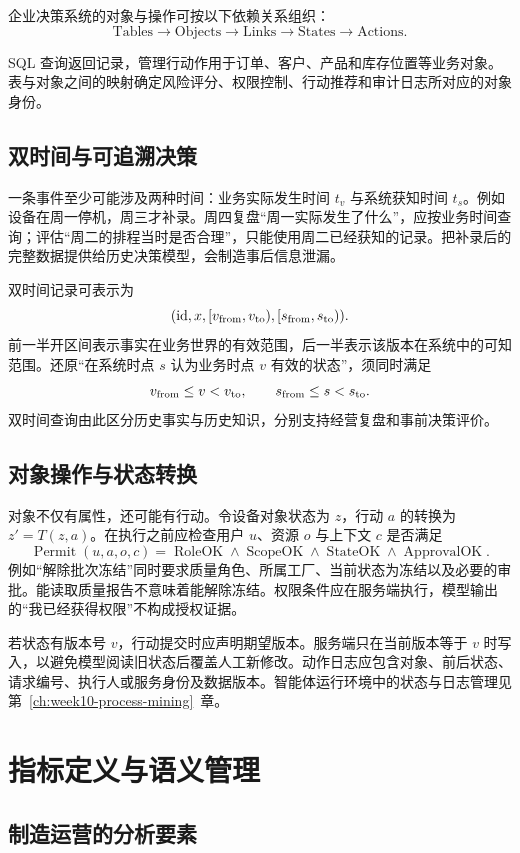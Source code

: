 企业决策系统的对象与操作可按以下依赖关系组织：
\[
\text{Tables}\rightarrow\text{Objects}\rightarrow\text{Links}\rightarrow\text{States}\rightarrow\text{Actions}.
\]

SQL 查询返回记录，管理行动作用于订单、客户、产品和库存位置等业务对象。表与对象之间的映射确定风险评分、权限控制、行动推荐和审计日志所对应的对象身份。

\subsection{双时间与可追溯决策}
一条事件至少可能涉及两种时间：业务实际发生时间 \(t_v\) 与系统获知时间 \(t_s\)。例如设备在周一停机，周三才补录。周四复盘“周一实际发生了什么”，应按业务时间查询；评估“周二的排程当时是否合理”，只能使用周二已经获知的记录。把补录后的完整数据提供给历史决策模型，会制造事后信息泄漏。

双时间记录可表示为
\[
(\text{id},x,[v_{\rm from},v_{\rm to}),[s_{\rm from},s_{\rm to})).
\]
前一半开区间表示事实在业务世界的有效范围，后一半表示该版本在系统中的可知范围。还原“在系统时点 \(s\) 认为业务时点 \(v\) 有效的状态”，须同时满足
\[
v_{\rm from}\le v<v_{\rm to},\qquad
s_{\rm from}\le s<s_{\rm to}.
\]
双时间查询由此区分历史事实与历史知识，分别支持经营复盘和事前决策评价。

\subsection{对象操作与状态转换}
对象不仅有属性，还可能有行动。令设备对象状态为 \(z\)，行动 \(a\) 的转换为 \(z'=T(z,a)\)。在执行之前应检查用户 \(u\)、资源 \(o\) 与上下文 \(c\) 是否满足
\[
\operatorname{Permit}(u,a,o,c)
=\operatorname{RoleOK}\land\operatorname{ScopeOK}
\land\operatorname{StateOK}\land\operatorname{ApprovalOK}.
\]
例如“解除批次冻结”同时要求质量角色、所属工厂、当前状态为冻结以及必要的审批。能读取质量报告不意味着能解除冻结。权限条件应在服务端执行，模型输出的“我已经获得权限”不构成授权证据。

若状态有版本号 \(v\)，行动提交时应声明期望版本。服务端只在当前版本等于 \(v\) 时写入，以避免模型阅读旧状态后覆盖人工新修改。动作日志应包含对象、前后状态、请求编号、执行人或服务身份及数据版本。智能体运行环境中的状态与日志管理见第~\ref{ch:week10-process-mining}~章。

\section{指标定义与语义管理}
\subsection{制造运营的分析要素}

